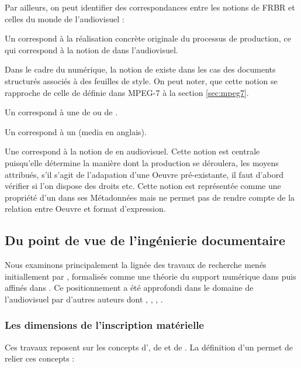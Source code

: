 Par ailleurs, on peut identifier des correspondances entre les notions de FRBR et celles du monde de l'audiovisuel :
\begin{liste}
	\item Un  correspond à la réalisation concrète originale du processus de production, ce qui correspond à la notion de  dans l'audiovisuel.
	
	\item Dans le cadre du numérique, la notion de  existe dans les cas des documents structurés associés à des feuilles de style.
	On peut noter, que cette notion se rapproche de celle de  définie dans MPEG-7 à la section \ref{sec:mpeg7}.

	\item Un  correspond à une  de  ou de .
	\item Un  correspond à un  (media en anglais).

	\item Une  correspond à la notion de  en audiovisuel.
	Cette notion est centrale puisqu'elle détermine la manière dont la production se déroulera, les moyens attribués, s'il s'agit de l'adapation d'une Oeuvre pré-existante, il faut d'abord vérifier si l'on dispose des droits etc.
	Cette notion est représentée comme une propriété d'un  dans ses Métadonnées mais ne permet pas de rendre compte de la relation entre Oeuvre et format d'expression.
\end{liste}





\subsection{Du point de vue de l'ingénierie documentaire}\label{sec:pv-id}
Nous examinons principalement la lignée des travaux de recherche menés initiallement par \cite{Bachimont1998}, formalisés comme une théorie du support numérique dans \cite{bachimont:hdr} puis affinés dans \cite{bachimont:icc}. 
Ce positionnement a été approfondi dans le domaine de l'audiovisuel par d'autres auteurs dont \cite{Prie1999}, \cite{Troncy2004}, \cite{Morizet-mahoudeaux2005a}, \cite{Gaillard2008}.

\subsubsection{Les dimensions de l'inscription matérielle}
Ces travaux reposent sur les concepts d', de  et de . 
La définition d'un  permet de relier ces concepts : 
 

